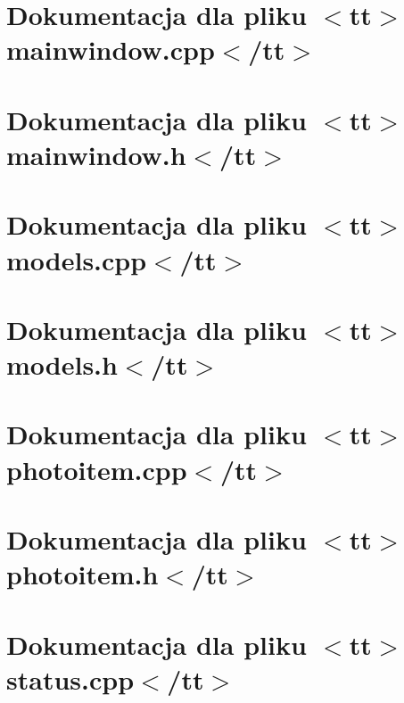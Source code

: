 \documentclass[twoside]{book}
\newcommand{\+}{\discretionary{\mbox{\scriptsize$\hookleftarrow$}}{}{}}
\begin{document}
\chapter{Dokumentacja dla pliku \texorpdfstring{$<$}{<}tt\texorpdfstring{$>$}{>}mainwindow.\+cpp\texorpdfstring{$<$}{<}/tt\texorpdfstring{$>$}{>}}
\label{md_documentation_mainwindow_cpp}

\chapter{Dokumentacja dla pliku \texorpdfstring{$<$}{<}tt\texorpdfstring{$>$}{>}mainwindow.\+h\texorpdfstring{$<$}{<}/tt\texorpdfstring{$>$}{>}}
\label{md_documentation_mainwindow_h}

\chapter{Dokumentacja dla pliku \texorpdfstring{$<$}{<}tt\texorpdfstring{$>$}{>}models.\+cpp\texorpdfstring{$<$}{<}/tt\texorpdfstring{$>$}{>}}
\label{md_documentation_models_cpp}

\chapter{Dokumentacja dla pliku \texorpdfstring{$<$}{<}tt\texorpdfstring{$>$}{>}models.\+h\texorpdfstring{$<$}{<}/tt\texorpdfstring{$>$}{>}}
\label{md_documentation_models_h}

\chapter{Dokumentacja dla pliku \texorpdfstring{$<$}{<}tt\texorpdfstring{$>$}{>}photoitem.\+cpp\texorpdfstring{$<$}{<}/tt\texorpdfstring{$>$}{>}}
\label{md_documentation_photoitem_cpp}

\chapter{Dokumentacja dla pliku \texorpdfstring{$<$}{<}tt\texorpdfstring{$>$}{>}photoitem.\+h\texorpdfstring{$<$}{<}/tt\texorpdfstring{$>$}{>}}
\label{md_documentation_photoitem_h}

\chapter{Dokumentacja dla pliku \texorpdfstring{$<$}{<}tt\texorpdfstring{$>$}{>}status.\+cpp\texorpdfstring{$<$}{<}/tt\texorpdfstring{$>$}{>}}
\label{md_documentation_status_cpp}

\end{document}
